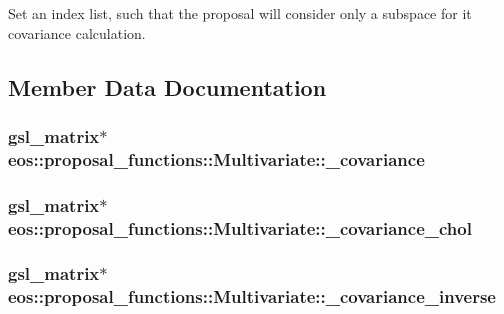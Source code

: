 \label{classeos_1_1proposal__functions_1_1Multivariate_ac143e4c3d64075a86a6aa837d187d134}
Set an index list, such that the proposal will consider only a subspace for it covariance calculation. 

\subsection{Member Data Documentation}
\hypertarget{classeos_1_1proposal__functions_1_1Multivariate_ad563d0d650e7cbd130c0229440c172fe}{
\subsubsection[{\_\-covariance}]{\setlength{\rightskip}{0pt plus 5cm}gsl\_\-matrix$\ast$ {\bf eos::proposal\_\-functions::Multivariate::\_\-covariance}}}
\label{classeos_1_1proposal__functions_1_1Multivariate_ad563d0d650e7cbd130c0229440c172fe}
\hypertarget{classeos_1_1proposal__functions_1_1Multivariate_a4ed7faa7ef374c0b6fbc065a45ce34d3}{
\subsubsection[{\_\-covariance\_\-chol}]{\setlength{\rightskip}{0pt plus 5cm}gsl\_\-matrix$\ast$ {\bf eos::proposal\_\-functions::Multivariate::\_\-covariance\_\-chol}}}
\label{classeos_1_1proposal__functions_1_1Multivariate_a4ed7faa7ef374c0b6fbc065a45ce34d3}
\hypertarget{classeos_1_1proposal__functions_1_1Multivariate_a91646502fcd9f17890b08ff8928e36f3}{
\subsubsection[{\_\-covariance\_\-inverse}]{\setlength{\rightskip}{0pt plus 5cm}gsl\_\-matrix$\ast$ {\bf eos::proposal\_\-functions::Multivariate::\_\-covariance\_\-inverse}}}
